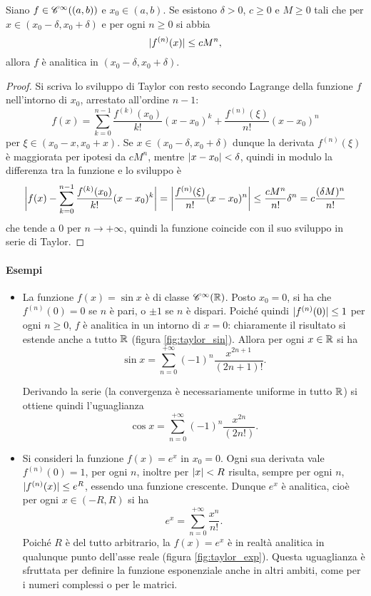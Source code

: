 \begin{teorema}
Siano $f\in\cont[\infty]{(a,b)}$ e $x_0\in(a,b)$. Se esistono $\delta>0$, $c\geq 0$ e $M\geq 0$ tali che per $x\in(x_0-\delta,x_0+\delta)$ e per ogni $n\geq 0$ si abbia
\[
\abs{f^{(n)}(x)}\leq cM^n,
\]
allora $f$ è analitica in $(x_0-\delta,x_0+\delta)$.
\end{teorema}
\begin{proof}
Si scriva lo sviluppo di Taylor con resto secondo Lagrange della funzione $f$ nell'intorno di $x_0$, arrestato all'ordine $n-1$:
\[
f(x)=\sum_{k=0}^{n-1}\frac{f^{(k)}(x_0)}{k!}(x-x_0)^k+\frac{f^{(n)}(\xi)}{n!}(x-x_0)^n
\]
per $\xi\in(x_0-x,x_0+x)$. Se $x\in(x_0-\delta,x_0+\delta)$ dunque la derivata $f^{(n)}(\xi)$ è maggiorata per ipotesi da $cM^n$, mentre $\abs{x-x_0}<\delta$, quindi in modulo la differenza tra la funzione e lo sviluppo è
\[
	\abs[\bigg]{f(x)-\sum_{k=0}^{n-1}\frac{f^{(k)}(x_0)}{k!}(x-x_0)^k}=\abs[\bigg]{\frac{f^{(n)}(\xi)}{n!}(x-x_0)^n}\leq\frac{cM^n}{n!}\delta^n=c\frac{(\delta M)^n}{n!}
\]
che tende a 0 per $n\to+\infty$, quindi la funzione coincide con il suo sviluppo in serie di Taylor.
\end{proof}
\paragraph{Esempi}
\begin{itemize}
\item La funzione $f(x)=\sin x$ è di classe $\cont[\infty]{\R}$. Posto $x_0=0$, si ha che $f^{(n)}(0)=0$ se $n$ è pari, o $\pm 1$ se $n$ è dispari. Poiché quindi $\abs{f^{(n)}(0)}\leq 1$ per ogni $n\geq 0$, $f$ è analitica in un intorno di $x=0$: chiaramente il risultato si estende anche a tutto $\R$ (figura \ref{fig:taylor_sin}).
Allora per ogni $x\in\R$ si ha
\[
\sin x=\sum_{n=0}^{+\infty}(-1)^n\frac{x^{2n+1}}{(2n+1)!}.
\]

Derivando la serie (la convergenza è necessariamente uniforme in tutto $\R$) si ottiene quindi l'uguaglianza
\[
\cos x=\sum_{n=0}^{+\infty}(-1)^n\frac{x^{2n}}{(2n!)}.
\]
\item Si consideri la funzione $f(x)=e^x$ in $x_0=0$. Ogni sua derivata vale $f^{(n)}(0)=1$, per ogni $n$, inoltre per $\abs{x}<R$ risulta, sempre per ogni $n$, $\abs{f^{(n)}(x)}\leq e^R$, essendo una funzione crescente. Dunque $e^x$ è analitica, cioè per ogni $x\in(-R,R)$ si ha
\[
e^x=\sum_{n=0}^{+\infty}\frac{x^n}{n!}.
\]
Poiché $R$ è del tutto arbitrario, la $f(x)=e^x$ è in realtà analitica in qualunque punto dell'asse reale (figura \ref{fig:taylor_exp}).
Questa uguaglianza è sfruttata per definire la funzione esponenziale anche in altri ambiti, come per i numeri complessi o per le matrici.
\end{itemize}

